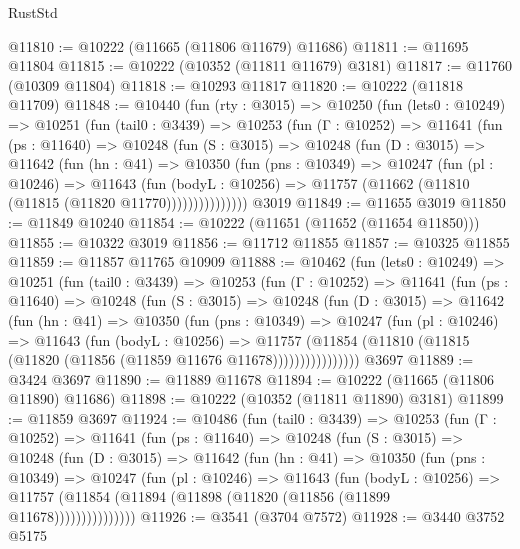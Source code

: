 \begin{lexlean}{RustStd}
\begin{coremodule}
@11810 := @10222 (@11665 (@11806 @11679) @11686)
@11811 := @11695 @11804
@11815 := @10222 (@10352 (@11811 @11679) @3181)
@11817 := @11760 (@10309 @11804)
@11818 := @10293 @11817
@11820 := @10222 (@11818 @11709)
@11848 := @10440
    (fun (rty : @3015) =>
    @10250
      (fun (lets0 : @10249) =>
      @10251
        (fun (tail0 : @3439) =>
        @10253
          (fun (Γ : @10252) =>
          @11641
            (fun (ps : @11640) =>
            @10248
              (fun (S : @3015) =>
              @10248
                (fun (D : @3015) =>
                @11642
                  (fun (hn : @41) =>
                  @10350
                    (fun (pns : @10349) =>
                    @10247
                      (fun (pl : @10246) =>
                      @11643
                        (fun (bodyL : @10256) =>
                        @11757 (@11662 (@11810 (@11815 (@11820 @11770)))))))))))))))
    @3019
@11849 := @11655 @3019
@11850 := @11849 @10240
@11854 := @10222 (@11651 (@11652 (@11654 @11850)))
@11855 := @10322 @3019
@11856 := @11712 @11855
@11857 := @10325 @11855
@11859 := @11857 @11765 @10909
@11888 := @10462
    (fun (lets0 : @10249) =>
    @10251
      (fun (tail0 : @3439) =>
      @10253
        (fun (Γ : @10252) =>
        @11641
          (fun (ps : @11640) =>
          @10248
            (fun (S : @3015) =>
            @10248
              (fun (D : @3015) =>
              @11642
                (fun (hn : @41) =>
                @10350
                  (fun (pns : @10349) =>
                  @10247
                    (fun (pl : @10246) =>
                    @11643
                      (fun (bodyL : @10256) =>
                      @11757
                        (@11854
                          (@11810 (@11815 (@11820 (@11856 (@11859 @11676 @11678))))))))))))))))
    @3697
@11889 := @3424 @3697
@11890 := @11889 @11678
@11894 := @10222 (@11665 (@11806 @11890) @11686)
@11898 := @10222 (@10352 (@11811 @11890) @3181)
@11899 := @11859 @3697
@11924 := @10486
    (fun (tail0 : @3439) =>
    @10253
      (fun (Γ : @10252) =>
      @11641
        (fun (ps : @11640) =>
        @10248
          (fun (S : @3015) =>
          @10248
            (fun (D : @3015) =>
            @11642
              (fun (hn : @41) =>
              @10350
                (fun (pns : @10349) =>
                @10247
                  (fun (pl : @10246) =>
                  @11643
                    (fun (bodyL : @10256) =>
                    @11757 (@11854 (@11894 (@11898 (@11820 (@11856 (@11899 @11678)))))))))))))))
@11926 := @3541 (@3704 @7572)
@11928 := @3440 @3752 @5175

\end{coremodule}
\end{lexlean}
